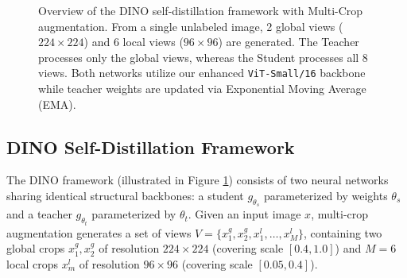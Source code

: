 \documentclass[11pt,a4paper]{article}
\begin{document}
\begin{figure}[t!]
{%
}
\caption{Overview of the DINO self-distillation framework with Multi-Crop augmentation. From a single unlabeled image, 2 global views ($224\times 224$) and 6 local views ($96\times 96$) are generated. The Teacher processes only the global views, whereas the Student processes all 8 views. Both networks utilize our enhanced \texttt{ViT-Small/16} backbone while teacher weights are updated via Exponential Moving Average (EMA).}
\label{fig:dino_pipeline}
\end{figure}

\subsection{DINO Self-Distillation Framework}
\label{subsec:dino_formulation}

The DINO framework (illustrated in Figure \ref{fig:dino_pipeline}) consists of two neural networks sharing identical structural backbones: a student $g_{\theta_s}$ parameterized by weights $\theta_s$ and a teacher $g_{\theta_t}$ parameterized by $\theta_t$. Given an input image $x$, multi-crop augmentation generates a set of views $V = \{x_1^g, x_2^g, x_1^l, \dots, x_M^l\}$, containing two global crops $x_1^g, x_2^g$ of resolution $224 \times 224$ (covering scale $[0.4, 1.0]$) and $M=6$ local crops $x_m^l$ of resolution $96 \times 96$ (covering scale $[0.05, 0.4]$).
\end{document}
